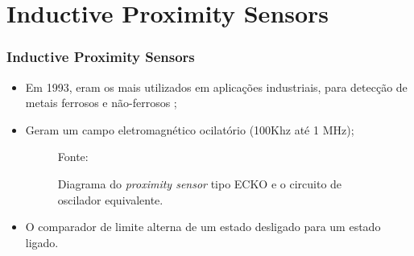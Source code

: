 \documentclass[xcolor=dvipsnames, aspectratio=169]{beamer}
\begin{document}
\section[Inductive Proximity Sensors]{Inductive Proximity Sensors} 
\begin{frame}
\frametitle{Inductive Proximity Sensors}
	\begin{itemize}
		\item Em 1993, eram os mais utilizados em aplicações industriais, para detecção de metais ferrosos e não-ferrosos \cite{everett1995sensors};
		\item Geram um campo eletromagnético ocilatório (100Khz até 1 MHz);
		\begin{figure}
			\centering
			{Fonte: \cite{everett1995sensors}}
			\caption{Diagrama do \textit{proximity sensor} tipo ECKO e o circuito de oscilador equivalente.}
			\label{fig:3_diagram_proximity_sensor}
		\end{figure}
		\newpage
		\item O comparador de limite alterna de um estado desligado para um estado ligado.
		\begin{figure}
			\centering

\end{figure}
\end{itemize}
\end{frame}
\end{document}

